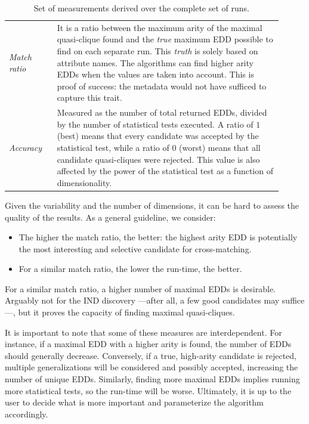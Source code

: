 \begin{table}[ht]
    \caption{Set of measurements derived over the complete set of runs.}
    \label{tab:derived_measurements}
    \centering
    \begin{tabular}{p{0.16\linewidth} p{0.75\linewidth}}
        \emph{Match ratio} & It is a ratio between the maximum arity of the maximal
        quasi-clique found and the \textit{true} maximum \gls{EDD} possible to find on
        each separate run.
        This \emph{truth} is solely based on attribute names. The algorithms can
        find higher arity \glspl{EDD} when the values are taken into account.
        This is proof of success: the metadata would not have sufficed to capture
        this trait. \\
        
        \emph{Accuracy} & Measured as the number of total returned \glspl{EDD}, divided by
        the number of statistical tests executed. A ratio of $1$ (best) means that every
        candidate was accepted by the statistical test, while a ratio of $0$ (worst)
        means that all candidate quasi-cliques were rejected. This value is
        also affected by the power of the statistical test as a function of
        dimensionality.\\
    \end{tabular}
\end{table}

Given the variability and the number of dimensions, it can be hard to assess the quality
of the results. As a general guideline, we consider:

\begin{itemize}
    \item The higher the match ratio, the better: the highest arity EDD
    is potentially the most interesting and selective candidate for cross-matching.
    \item For a similar match ratio, the lower the run-time, the better.
\end{itemize}

For a similar match ratio, a higher number of maximal \glspl{EDD} is desirable. Arguably not
for the \gls{IND} discovery ---after all, a few good candidates may suffice---,
but it proves the capacity of finding maximal quasi-cliques.

It is important to note that some of these measures are interdependent. For instance,
if a maximal \gls{EDD} with a higher arity is found, the number of \glspl{EDD} should generally decrease.
Conversely, if a true, high-arity candidate is rejected, multiple generalizations will be considered
and possibly accepted, increasing the number of unique \glspl{EDD}.
Similarly, finding more maximal \glspl{EDD} implies running more statistical
tests, so the run-time will be worse. Ultimately, it is up to the user to decide what is
more important and parameterize the algorithm accordingly.

